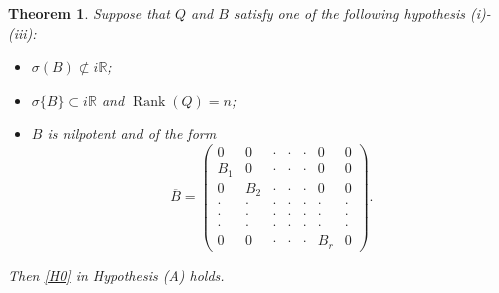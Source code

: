 \documentclass[10pt,a4paper]{amsart}
\newtheorem{theorem}{Theorem}
\def \R {\mathbb{R}}
\begin{document}
\begin{theorem}\label{T:trB}
Suppose that $Q$ and $B$ satisfy \emph{one} of the following hypothesis \emph{(i)-(iii)}:
\begin{itemize}
\item[(i)] $\sigma(B)\not\subset i\R$;
\item[(ii)] $\sigma\{B\}\subset i \R$ and $\operatorname{Rank}(Q) = n$; 
\item[(iii)] $B$ is nilpotent and of the form 
\begin{equation}\label{barB}
\overline B = \begin{pmatrix} 0 & 0 & \cdot & \cdot & \cdot & 0 & 0
\\
B_1 & 0 & \cdot & \cdot & \cdot & 0 & 0
\\
0 & B_2 & \cdot & \cdot & \cdot &  0 & 0
\\
\cdot & \cdot & \cdot & \cdot & \cdot & \cdot & \cdot
\\
\cdot & \cdot & \cdot & \cdot & \cdot & \cdot & \cdot
\\
\cdot & \cdot & \cdot & \cdot & \cdot & \cdot & \cdot
\\
0 & 0 & \cdot & \cdot & \cdot &  B_r & 0
\end{pmatrix}.
\end{equation}
\end{itemize}
Then \eqref{H0} in \emph{Hypothesis (A)} holds.
\end{theorem}
\end{document}

